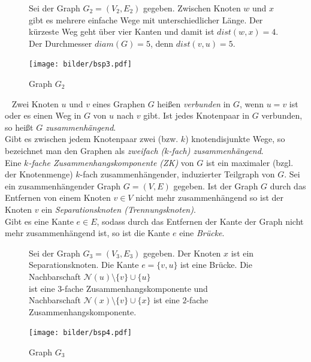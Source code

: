 \begin{figure}[h!]
\begin{minipage}{230pt}
Sei der Graph $G_2=(V_2,E_2)$ gegeben. Zwischen Knoten $w$ und $x$ gibt es mehrere einfache Wege mit unterschiedlicher Länge. Der kürzeste Weg geht über vier Kanten und damit ist $dist(w, x)=4$. Der Durchmesser $diam(G)=5$, denn $dist(v, u)=5$.
\end{minipage}
\begin{minipage}{220pt}
		\centering 		 
   \texttt{[image: bilder/bsp3.pdf]}
	\caption{Graph $G_2$}
\end{minipage}
  	 \end{figure}
  	 \vspace{-2mm}
  	 ~\linebreak
Zwei Knoten $u$ und $v$ eines Graphen $G$ heißen \emph{verbunden} in $G$, wenn $u = v$ ist oder es einen Weg in $G$ von $u$ nach $v$ gibt. Ist jedes Knotenpaar in $G$ verbunden, so heißt $G$ \emph{zusammenhängend}.\\Gibt es zwischen jedem Knotenpaar zwei (bzw. $k$) knotendisjunkte Wege, so bezeichnet man den Graphen als \emph{zweifach ($k$-fach) zusammenhängend}.\\Eine \emph{$k$-fache Zusammenhangskomponente (ZK)} von $G$ ist ein maximaler (bzgl. der Knotenmenge) $k$-fach zusammenhängender, induzierter Teilgraph von $G$.\newline\newline
Sei ein zusammenhängender Graph $G=(V,E)$ gegeben. Ist der Graph $G$ durch das Entfernen von einem Knoten $v \in V$ nicht mehr zusammenhängend so ist der Knoten $v$ ein \emph{Separationsknoten (Trennungsknoten)}.\\Gibt es eine Kante $e \in E$, sodass durch das Entfernen der Kante der Graph nicht mehr zusammenhängend ist, so ist die Kante $e$ eine \emph{Brücke}.

\begin{figure}[h!]
\begin{minipage}{260pt}
Sei der Graph $G_3=(V_3,E_3)$ gegeben. Der Knoten $x$ ist ein Separationsknoten. Die Kante $e=\{v,u\}$ ist eine Brücke. Die Nachbarschaft $\mathcal{N}(u)\setminus \{v\}\cup\{u\}$\\ist eine $3$-fache Zusammenhangskomponente und\\Nachbarschaft $\mathcal{N}(x)\setminus \{v\}\cup\{x\}$ ist eine $2$-fache Zusammenhangskomponente.
\end{minipage}
\begin{minipage}{160pt}
		\centering 		 
   \texttt{[image: bilder/bsp4.pdf]}
	\caption{Graph $G_3$}
\end{minipage}
  	 \end{figure}
  	\newpage
